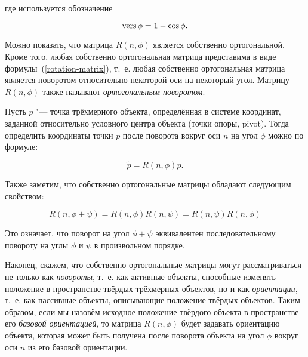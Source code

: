 \noindent где используется обозначение

$$\operatorname{vers}\phi=1-\cos\phi.$$

Можно показать, что матрица $R(n,\phi)$ является собственно ортогональной. Кроме того, любая собственно ортогональная
матрица представима в виде формулы~(\ref{rotation-matrix}), т.~е. любая собственно ортогональная матрица
является поворотом относительно некоторой оси на некоторый угол. Матрицу $R(n,\phi)$ также называют
\textit{ортогональным поворотом}.

Пусть $p$ "--- точка трёхмерного объекта, определённая в системе координат, заданной относительно условного центра
объекта (точки опоры, pivot). Тогда определить координаты точки $p$ после поворота вокруг оси $n$ на угол $\phi$
можно по формуле:

$$
\tilde p=R(n,\phi)p.
$$

Также заметим, что собственно ортогональные матрицы обладают следующим свойством:

$$
R(n,\phi+\psi)=R(n,\phi)R(n,\psi)=R(n,\psi)R(n,\phi)
$$

Это означает, что поворот на угол $\phi+\psi$ эквивалентен последовательному повороту на углы $\phi$ и $\psi$ в
произвольном порядке.

Наконец, скажем, что собственно ортогональные матрицы могут рассматриваться не только как \textit{повороты}, т.~е. как
активные объекты, способные изменять положение в пространстве твёрдых трёхмерных объектов, но и как
\textit{ориентации}, т.~е. как пассивные объекты, описывающие положение твёрдых объектов. Таким образом, если мы назовём
исходное положение твёрдого объекта в пространстве его \textit{базовой ориентацией}, то матрица $R(n,\phi)$ будет
задавать ориентацию объекта, которая может быть получена после поворота объекта на угол $\phi$ вокруг оси $n$ из его
базовой ориентации.
